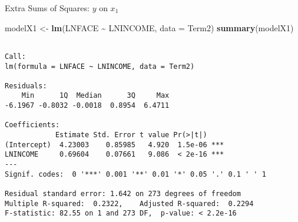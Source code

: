 \documentclass[
  ignorenonframetext,
]{beamer}
\newenvironment{Shaded}{\begin{snugshade}}{\end{snugshade}}
\newcommand{\AttributeTok}[1]{\textcolor[rgb]{0.13,0.29,0.53}{#1}}
\newcommand{\FunctionTok}[1]{\textcolor[rgb]{0.13,0.29,0.53}{\textbf{#1}}}
\newcommand{\NormalTok}[1]{#1}
\newcommand{\OtherTok}[1]{\textcolor[rgb]{0.56,0.35,0.01}{#1}}
\newcommand{\SpecialCharTok}[1]{\textcolor[rgb]{0.81,0.36,0.00}{\textbf{#1}}}
\begin{document}
\begin{frame}[fragile]{Extra Sums of Squares: \(y\) on \(x_1\)}
\protect\hypertarget{extra-sums-of-squares-y-on-x_1}{}
\footnotesize

\begin{Shaded}
\begin{Highlighting}[]
\NormalTok{modelX1 }\OtherTok{\textless{}{-}} \FunctionTok{lm}\NormalTok{(LNFACE }\SpecialCharTok{\textasciitilde{}}\NormalTok{ LNINCOME, }\AttributeTok{data =}\NormalTok{ Term2)}
\FunctionTok{summary}\NormalTok{(modelX1)}
\end{Highlighting}
\end{Shaded}

\begin{verbatim}

Call:
lm(formula = LNFACE ~ LNINCOME, data = Term2)

Residuals:
    Min      1Q  Median      3Q     Max 
-6.1967 -0.8032 -0.0018  0.8954  6.4711 

Coefficients:
            Estimate Std. Error t value Pr(>|t|)    
(Intercept)  4.23003    0.85985   4.920  1.5e-06 ***
LNINCOME     0.69604    0.07661   9.086  < 2e-16 ***
---
Signif. codes:  0 '***' 0.001 '**' 0.01 '*' 0.05 '.' 0.1 ' ' 1

Residual standard error: 1.642 on 273 degrees of freedom
Multiple R-squared:  0.2322,    Adjusted R-squared:  0.2294 
F-statistic: 82.55 on 1 and 273 DF,  p-value: < 2.2e-16
\end{verbatim}

\normalsize
\end{frame}
\end{document}
